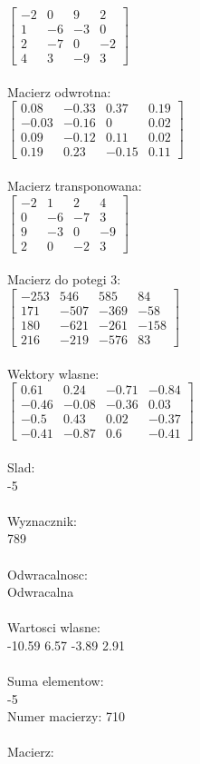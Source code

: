 \documentclass[a4paper,12pt]{article}
\begin{document}
$\begin{bmatrix} -2&0&9&2\\1&-6&-3&0\\2&-7&0&-2\\4&3&-9&3 \end{bmatrix}$
\\
\\
Macierz odwrotna:\\

$\begin{bmatrix} 0.08&-0.33&0.37&0.19\\-0.03&-0.16&0&0.02\\0.09&-0.12&0.11&0.02\\0.19&0.23&-0.15&0.11 \end{bmatrix}$
\\
\\
Macierz transponowana:\\

$\begin{bmatrix} -2&1&2&4\\0&-6&-7&3\\9&-3&0&-9\\2&0&-2&3 \end{bmatrix}$
\\
\\
Macierz do potegi 3:\\

$\begin{bmatrix} -253&546&585&84\\171&-507&-369&-58\\180&-621&-261&-158\\216&-219&-576&83 \end{bmatrix}$
\\
\\
Wektory wlasne:\\

$\begin{bmatrix} 0.61&0.24&-0.71&-0.84\\-0.46&-0.08&-0.36&0.03\\-0.5&0.43&0.02&-0.37\\-0.41&-0.87&0.6&-0.41 \end{bmatrix}$
\\
\\
Slad:\\
-5
\\
\\
Wyznacznik:\\
789
\\
\\
Odwracalnosc:\\
Odwracalna
\\
\\
Wartosci wlasne:\\
-10.59 6.57 -3.89 2.91
\\
\\
Suma elementow:\\
-5
\\
\newpage
Numer macierzy:
710
\\
\\
Macierz:\\
\end{document}
